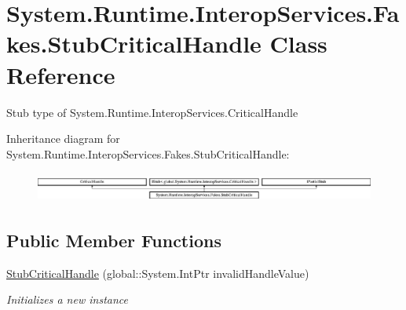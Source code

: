 \hypertarget{class_system_1_1_runtime_1_1_interop_services_1_1_fakes_1_1_stub_critical_handle}{\section{System.\-Runtime.\-Interop\-Services.\-Fakes.\-Stub\-Critical\-Handle Class Reference}
\label{class_system_1_1_runtime_1_1_interop_services_1_1_fakes_1_1_stub_critical_handle}
}


Stub type of System.\-Runtime.\-Interop\-Services.\-Critical\-Handle 


Inheritance diagram for System.\-Runtime.\-Interop\-Services.\-Fakes.\-Stub\-Critical\-Handle\-:\begin{figure}[H]
\begin{center}
\leavevmode
\includegraphics[height=0.995556cm]{class_system_1_1_runtime_1_1_interop_services_1_1_fakes_1_1_stub_critical_handle}
\end{center}
\end{figure}
\subsection*{Public Member Functions}
\begin{DoxyCompactItemize}
\item 
\hyperlink{class_system_1_1_runtime_1_1_interop_services_1_1_fakes_1_1_stub_critical_handle_a863f6105cadd472f69541f0f94a4a292}{Stub\-Critical\-Handle} (global\-::\-System.\-Int\-Ptr invalid\-Handle\-Value)
\begin{DoxyCompactList}\small\item\em Initializes a new instance\end{DoxyCompactList}\end{DoxyCompactItemize}
